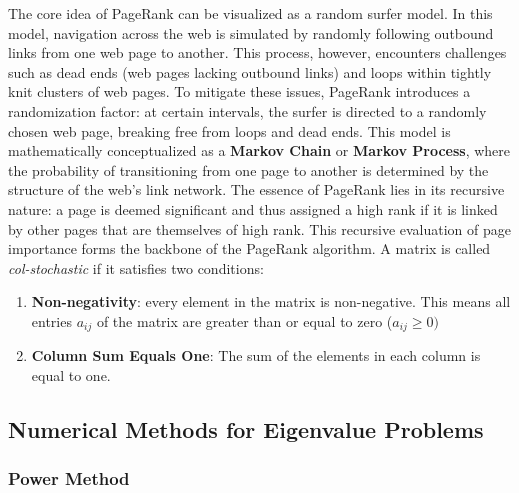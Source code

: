 \documentclass[unicode,11pt,a4paper,oneside,numbers=endperiod,openany]{scrartcl}
\begin{document}
The core idea of PageRank can be visualized as a random surfer model. In this model, navigation across the web is simulated by randomly following outbound links from one web page to another. This process, however, encounters challenges such as dead ends (web pages lacking outbound links) and loops within tightly knit clusters of web pages. To mitigate these issues, PageRank introduces a randomization factor: at certain intervals, the surfer is directed to a randomly chosen web page, breaking free from loops and dead ends.
\newline
This model is mathematically conceptualized as a \textbf{Markov Chain} or \textbf{Markov Process}, where the probability of transitioning from one page to another is determined by the structure of the web's link network. The essence of PageRank lies in its recursive nature: a page is deemed significant and thus assigned a high rank if it is linked by other pages that are themselves of high rank. This recursive evaluation of page importance forms the backbone of the PageRank algorithm.
\newline \newline
A matrix is called \textit{col-stochastic} if it satisfies two conditions:
\begin{enumerate}
 \item {\textbf{Non-negativity}: every element in the matrix is non-negative. This means all entries $a_{ij}$ of the matrix are greater than or equal to zero ($a_{ij} \geq 0)$}
 \item{\textbf{Column Sum Equals One}: The sum of the elements in each column is equal to one.}
\end{enumerate}

\subsection{Numerical Methods for Eigenvalue Problems}

\subsubsection{Power Method}
\end{document}
